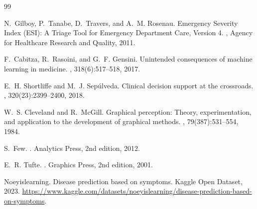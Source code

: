 \documentclass[conference]{IEEEtran}
\begin{document}
\FloatBarrier
\begin{thebibliography}{99}

N.~Gilboy, P.~Tanabe, D.~Travers, and A.~M. Rosenau.
\newblock Emergency Severity Index (ESI): A Triage Tool for Emergency Department Care, Version 4.
, Agency for Healthcare Research and Quality, 2011.

F.~Cabitza, R.~Rasoini, and G.~F. Gensini.
\newblock Unintended consequences of machine learning in medicine.
, 318(6):517--518, 2017.

E.~H. Shortliffe and M.~J. Sep{\'u}lveda.
\newblock Clinical decision support at the crossroads.
, 320(23):2399--2400, 2018.

W.~S. Cleveland and R.~McGill.
\newblock Graphical perception: Theory, experimentation, and application to the development of graphical methods.
, 79(387):531--554, 1984.

S.~Few.
.
\newblock Analytics Press, 2nd edition, 2012.

E.~R. Tufte.
.
\newblock Graphics Press, 2nd edition, 2001.

Noeyislearning.
\newblock Disease prediction based on symptoms.
\newblock Kaggle Open Dataset, 2023. \url{https://www.kaggle.com/datasets/noeyislearning/disease-prediction-based-on-symptoms}.

\end{thebibliography}
\end{document}
